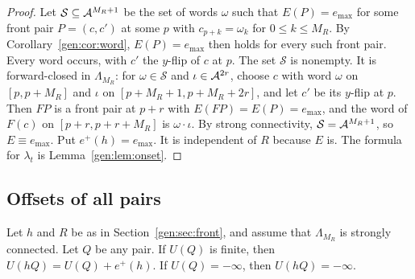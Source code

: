 \begin{proof}
Let $\mathcal S\subseteq\mathcal{A}^{M_R+1}$ be the set of words $\omega$ such that $E(P)=e_{\max}$ for some front pair $P=(c,c')$ at some $p$ with $c_{p+k}=\omega_k$ for $0\le k\le M_R$. By Corollary~\ref{gen:cor:word}, $E(P)=e_{\max}$ then holds for every such front pair. Every word occurs, with $c'$ the $y$-flip of $c$ at $p$. The set $\mathcal S$ is nonempty. It is forward-closed in $\Lambda_{M_R}$: for $\omega\in\mathcal S$ and $\iota\in\mathcal{A}^{2r}$, choose $c$ with word $\omega$ on $[p,p+M_R]$ and $\iota$ on $[p+M_R+1,p+M_R+2r]$, and let $c'$ be its $y$-flip at $p$. Then $FP$ is a front pair at $p+r$ with $E(FP)=E(P)=e_{\max}$, and the word of $F(c)$ on $[p+r,p+r+M_R]$ is $\omega\cdot\iota$. By strong connectivity, $\mathcal S=\mathcal{A}^{M_R+1}$, so $E\equiv e_{\max}$. Put $e^+(h)=e_{\max}$. It is independent of $R$ because $E$ is. The formula for $\lambda_t$ is Lemma~\ref{gen:lem:onset}.
\end{proof}

\subsection{Offsets of all pairs}\label{gen:sec:allpairs}

\begin{lemma}\label{gen:lem:allpairs}
Let $h$ and $R$ be as in Section~\ref{gen:sec:front}, and assume that $\Lambda_{M_R}$ is strongly connected. Let $Q$ be any pair. If $U(Q)$ is finite, then $U(hQ)=U(Q)+e^+(h)$. If $U(Q)=-\infty$, then $U(hQ)=-\infty$.
\end{lemma}

